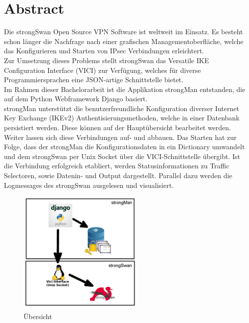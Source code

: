 \section{Abstract}
Die strongSwan Open Source VPN Software ist weltweit im Einsatz. Es besteht schon länger die Nachfrage nach einer grafischen Managementoberfläche, welche das Konfigurieren und Starten von IPsec Verbindungen erleichtert.\\
Zur Umsetzung dieses Problems stellt strongSwan das Versatile IKE Configuration Interface (VICI) zur Verfügung, welches für diverse Programmiersprachen eine JSON-artige Schnittstelle bietet. \\
Im Rahmen dieser Bachelorarbeit ist die Applikation strongMan entstanden, die auf dem Python Webframework Django basiert.\\

strongMan unterstützt die benutzerfreundliche Konfiguration diverser Internet Key Exchange (IKEv2) Authentisierungsmethoden, welche in einer Datenbank persistiert werden. Diese können auf der Hauptübersicht bearbeitet werden. Weiter lassen sich diese Verbindungen auf- und abbauen. Das Starten hat zur Folge, dass der strongMan die Konfigurationsdaten in ein Dictionary umwandelt und dem strongSwan per Unix Socket über die VICI-Schnittstelle übergibt. Ist die Verbindung erfolgreich etabliert, werden Statusinformationen zu Traffic Selectoren, sowie Datenin- und Output dargestellt. Parallel dazu werden die Logmessages des strongSwan ausgelesen und visualisiert.\\

\begin{figure}
  \begin{center}
    \includegraphics[width=230px]{images/strongman_ubersicht.jpg}
  \end{center}
    \caption[Übersicht]{Übersicht}
\end{figure}

